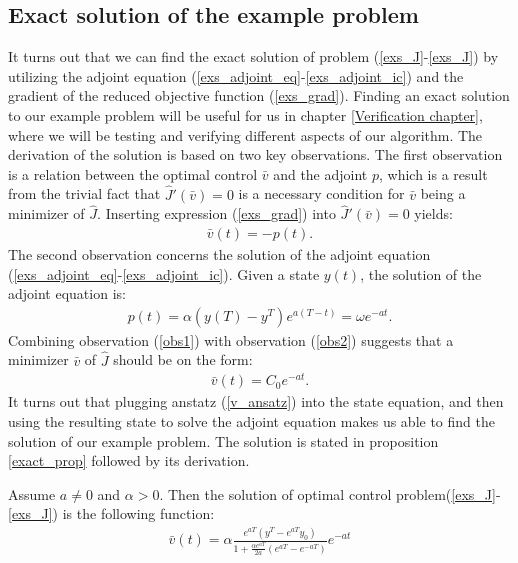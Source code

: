 \subsection{Exact solution of the example problem} \label{exact_sec}
It turns out that we can find the exact solution of problem (\ref{exs_J}-\ref{exs_J}) by utilizing the adjoint equation (\ref{exs_adjoint_eq}-\ref{exs_adjoint_ic}) and the gradient of the reduced objective function (\ref{exs_grad}). Finding an exact solution to our example problem will be useful for us in chapter \ref{Verification chapter}, where we will be testing and verifying different aspects of our algorithm. The derivation of the solution is based on two key observations. The first observation is a relation between the optimal control $\bar v$ and the adjoint $p$, which is a result from the trivial fact that $\hat J'(\bar v)=0$ is a necessary condition for $\bar v$ being a minimizer of $\hat J$. Inserting expression (\ref{exs_grad}) into $\hat J'(\bar v)=0$ yields:
\begin{align}
\bar v(t)=-p(t). \label{obs1}
\end{align} 
The second observation concerns the solution of the adjoint equation (\ref{exs_adjoint_eq}-\ref{exs_adjoint_ic}). Given a state $y(t)$, the solution of the adjoint equation is:
\begin{align}
p(t) = \alpha(y(T)-y^T)e^{a(T-t)} = \omega e^{-at}. \label{obs2}
\end{align}
Combining observation (\ref{obs1}) with observation (\ref{obs2}) suggests that a minimizer $\bar v$ of $\hat J$ should be on the form:
\begin{align}
\bar v(t) = C_0 e^{-at}. \label{v_ansatz}
\end{align}
It turns out that plugging anstatz (\ref{v_ansatz}) into the state equation, and then using the resulting state to solve the adjoint equation makes us able to find the solution of our example problem. The solution is stated in proposition \ref{exact_prop} followed by its derivation.
\begin{proposition} \label{exact_prop}
Assume $a\neq0$ and $\alpha>0$. Then the solution of optimal control problem(\ref{exs_J}-\ref{exs_J}) is the following function:
\begin{align}
\bar v(t) = \alpha\frac{e^{aT}(y^T-e^{aT}y_0)}{1+\frac{\alpha e^{aT}}{2a}(e^{aT}-e^{-aT})}e^{-at}
\end{align}
\end{proposition}
